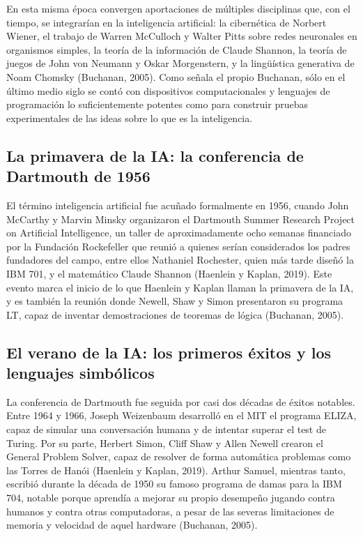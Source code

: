 \documentclass[12pt,letterpaper]{article}
\begin{document}
En esta misma \'epoca convergen aportaciones de m\'ultiples disciplinas que, con el tiempo, se integrar\'ian en la inteligencia artificial: la cibern\'etica de Norbert Wiener, el trabajo de Warren McCulloch y Walter Pitts sobre redes neuronales en organismos simples, la teor\'ia de la informaci\'on de Claude Shannon, la teor\'ia de juegos de John von Neumann y Oskar Morgenstern, y la ling\"u\'istica generativa de Noam Chomsky (Buchanan, 2005). Como se\~nala el propio Buchanan, s\'olo en el \'ultimo medio siglo se cont\'o con dispositivos computacionales y lenguajes de programaci\'on lo suficientemente potentes como para construir pruebas experimentales de las ideas sobre lo que es la inteligencia.

\subsection{La primavera de la IA: la conferencia de Dartmouth de 1956}

El t\'ermino inteligencia artificial fue acu\~nado formalmente en 1956, cuando John McCarthy y Marvin Minsky organizaron el Dartmouth Summer Research Project on Artificial Intelligence, un taller de aproximadamente ocho semanas financiado por la Fundaci\'on Rockefeller que reuni\'o a quienes ser\'ian considerados los padres fundadores del campo, entre ellos Nathaniel Rochester, quien m\'as tarde dise\~n\'o la IBM 701, y el matem\'atico Claude Shannon (Haenlein y Kaplan, 2019). Este evento marca el inicio de lo que Haenlein y Kaplan llaman la primavera de la IA, y es tambi\'en la reuni\'on donde Newell, Shaw y Simon presentaron su programa LT, capaz de inventar demostraciones de teoremas de l\'ogica (Buchanan, 2005).

\subsection{El verano de la IA: los primeros \'exitos y los lenguajes simb\'olicos}

La conferencia de Dartmouth fue seguida por casi dos d\'ecadas de \'exitos notables. Entre 1964 y 1966, Joseph Weizenbaum desarroll\'o en el MIT el programa ELIZA, capaz de simular una conversaci\'on humana y de intentar superar el test de Turing. Por su parte, Herbert Simon, Cliff Shaw y Allen Newell crearon el General Problem Solver, capaz de resolver de forma autom\'atica problemas como las Torres de Han\'oi (Haenlein y Kaplan, 2019). Arthur Samuel, mientras tanto, escribi\'o durante la d\'ecada de 1950 su famoso programa de damas para la IBM 704, notable porque aprend\'ia a mejorar su propio desempe\~no jugando contra humanos y contra otras computadoras, a pesar de las severas limitaciones de memoria y velocidad de aquel hardware (Buchanan, 2005).
\end{document}
